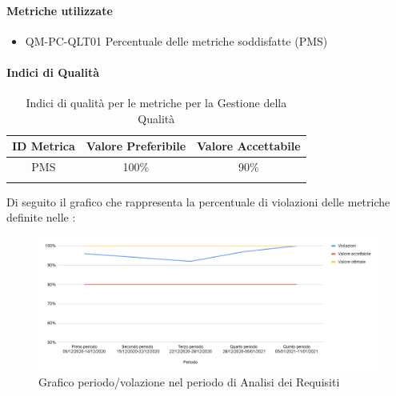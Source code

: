 		\paragraph{Metriche utilizzate}
			\begin{itemize}
				\item QM-PC-QLT01 Percentuale delle metriche soddisfatte (PMS)
			\end{itemize}
			
		\paragraph{Indici di Qualità}
			\begin{center}
				\begin{longtable}{|c|c|c|}
				\hline
				\rowcolor{lighter-grayer}
				\textbf{ID Metrica} & \textbf{Valore Preferibile} & \textbf{Valore Accettabile}\\
				\hline
				\endfirsthead
				\hline
				PMS & 100\% & 90\% \\
				\hline
				\caption{Indici di qualità per le metriche per la Gestione della Qualità}
				\end{longtable}
			\end{center}

			
			
			Di seguito il grafico che rappresenta la percentuale di violazioni delle metriche definite nelle :
			\begin{figure}[H]
				\centering
				\includegraphics[width=0.9\linewidth]{./res/images/violazioni.png}
				\caption{Grafico periodo/volazione nel periodo di Analisi dei Requisiti}
				\label{fig:Grafico violazioni periodo di Analisi dei Requisiti}
			\end{figure}

